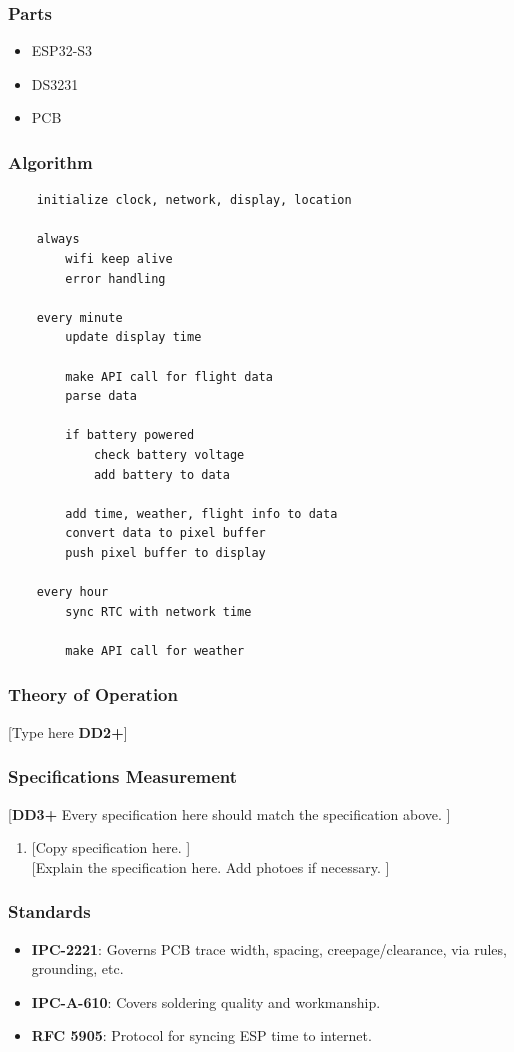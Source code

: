 \subsubsection{Parts}
\begin{itemize}
    \item ESP32-S3
    \item DS3231
    \item PCB
\end{itemize}

\subsubsection{Algorithm}
\begin{lstlisting}
    initialize clock, network, display, location

    always 
        wifi keep alive
        error handling
    
    every minute
        update display time

        make API call for flight data
        parse data

        if battery powered
            check battery voltage
            add battery to data

        add time, weather, flight info to data
        convert data to pixel buffer
        push pixel buffer to display
    
    every hour
        sync RTC with network time

        make API call for weather

\end{lstlisting}

\subsubsection{Theory of Operation}
[Type here \textbf{DD2+}]

\subsubsection{Specifications Measurement}
[\textbf{DD3+} Every specification here should match the specification above. ]
\begin{enumerate}
    \item {[Copy specification here. ]} \\
          {[Explain the specification here. Add photoes if necessary. ]}
\end{enumerate}

\subsubsection{Standards}
\begin{itemize}
    \item \textbf{IPC-2221}: Governs PCB trace width, spacing, creepage/clearance, via rules, grounding, etc.
    \item \textbf{IPC-A-610}: Covers soldering quality and workmanship.
    \item \textbf{RFC 5905}: Protocol for syncing ESP time to internet.
\end{itemize}